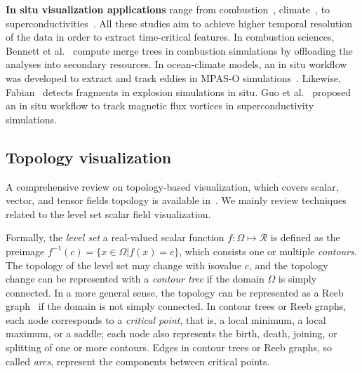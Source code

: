 

{\bf In situ visualization applications} range from combustion~\cite{YuWGCM10, BennettABGGJKKPPPTYZC12}, climate~\cite{WoodringPSPAH16}, to superconductivities~\cite{GuoPG17}.  All these studies aim to achieve higher temporal resolution of the data in order to extract time-critical features.
In combustion sciences, Bennett et al.~\cite{BennettABGGJKKPPPTYZC12} compute merge trees in combustion simulations by offloading the analyses into secondary resources.  
In ocean-climate models, an in situ workflow was developed to extract and track eddies in MPAS-O simulations~\cite{WoodringPSPAH16}.  
Likewise, Fabian~\cite{Fabian12} detects fragments in explosion simulations in situ.  
Guo et al.~\cite{GuoPG17} proposed an in situ workflow to track magnetic flux vortices in superconductivity simulations.  





\subsection{Topology visualization}
\label{sec:topology}

A comprehensive review on topology-based visualization, which covers scalar, vector, and tensor fields topology is available in~\cite{HeineLHIFSHG16}.  We mainly review techniques related to the level set scalar field visualization.  

Formally, the \emph{level set} a real-valued scalar function $f: \Omega\mapsto\mathcal{R}$ is defined as the preimage $f^{-1}(c) = \{x\in\Omega | f(x) = c \}$, which consists one or multiple \emph{contours}.  The topology of the level set may change with isovalue $c$, and the topology change can be represented with a \emph{contour tree} if the domain $\Omega$ is simply connected.  In a more general sense, the topology can be represented as a Reeb graph~\cite{Reeb46} if the domain is not simply connected.  In contour trees or Reeb graphs, each node corresponds to a \emph{critical point}, that is, a local minimum, a local maximum, or a saddle; each node also represents the birth, death, joining, or splitting of one or more contours.  Edges in contour trees or Reeb graphs, so called \emph{arcs}, represent the components between critical points. 

